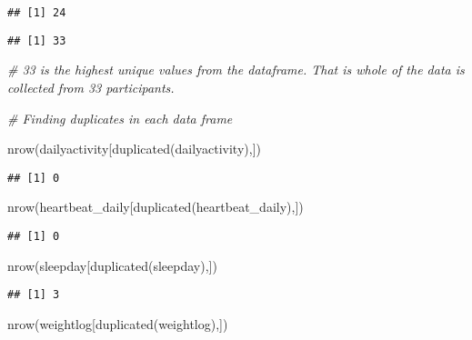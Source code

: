 \documentclass[
]{article}
\newenvironment{Shaded}{\begin{snugshade}}{\end{snugshade}}
\newcommand{\CommentTok}[1]{\textcolor[rgb]{0.56,0.35,0.01}{\textit{#1}}}
\newcommand{\FunctionTok}[1]{\textcolor[rgb]{0.00,0.00,0.00}{#1}}
\newcommand{\NormalTok}[1]{#1}
\newcommand{\SpecialCharTok}[1]{\textcolor[rgb]{0.00,0.00,0.00}{#1}}
\begin{document}
\begin{verbatim}
## [1] 24
\end{verbatim}

\begin{Shaded}
\end{Shaded}

\begin{verbatim}
## [1] 33
\end{verbatim}

\begin{Shaded}
\begin{Highlighting}[]
\CommentTok{\# 33 is the highest unique values from the dataframe. That is whole of the data is collected from 33 participants.}

\CommentTok{\# Finding duplicates in each data frame}

\FunctionTok{nrow}\NormalTok{(dailyactivity[}\FunctionTok{duplicated}\NormalTok{(dailyactivity),])}
\end{Highlighting}
\end{Shaded}

\begin{verbatim}
## [1] 0
\end{verbatim}

\begin{Shaded}
\begin{Highlighting}[]
\FunctionTok{nrow}\NormalTok{(heartbeat\_daily[}\FunctionTok{duplicated}\NormalTok{(heartbeat\_daily),])}
\end{Highlighting}
\end{Shaded}

\begin{verbatim}
## [1] 0
\end{verbatim}

\begin{Shaded}
\begin{Highlighting}[]
\FunctionTok{nrow}\NormalTok{(sleepday[}\FunctionTok{duplicated}\NormalTok{(sleepday),])}
\end{Highlighting}
\end{Shaded}

\begin{verbatim}
## [1] 3
\end{verbatim}

\begin{Shaded}
\begin{Highlighting}[]
\FunctionTok{nrow}\NormalTok{(weightlog[}\FunctionTok{duplicated}\NormalTok{(weightlog),])}
\end{Highlighting}
\end{Shaded}
\end{document}
